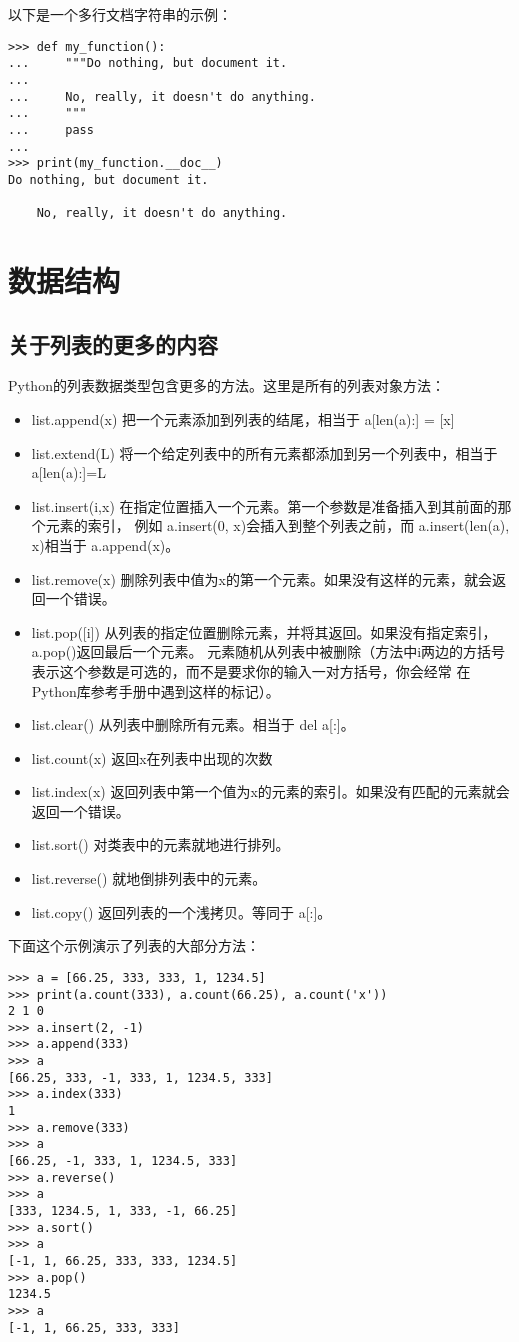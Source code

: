 \documentclass[UTF8]{ctexart}
\begin{document}
以下是一个多行文档字符串的示例：
\begin{verbatim}
>>> def my_function():
...     """Do nothing, but document it.
...
...     No, really, it doesn't do anything.
...     """
...     pass
...
>>> print(my_function.__doc__)
Do nothing, but document it.

	No, really, it doesn't do anything.
\end{verbatim}

\section{数据结构}
\subsection{关于列表的更多的内容}
Python的列表数据类型包含更多的方法。这里是所有的列表对象方法：
\begin{itemize}
  \item list.append(x) 把一个元素添加到列表的结尾，相当于 a[len(a):] = [x]
  \item list.extend(L) 将一个给定列表中的所有元素都添加到另一个列表中，相当于 a[len(a):]=L
  \item list.insert(i,x) 在指定位置插入一个元素。第一个参数是准备插入到其前面的那个元素的索引，
  例如 a.insert(0, x)会插入到整个列表之前，而 a.insert(len(a), x)相当于 a.append(x)。
  \item list.remove(x) 删除列表中值为x的第一个元素。如果没有这样的元素，就会返回一个错误。
  \item list.pop([i]) 从列表的指定位置删除元素，并将其返回。如果没有指定索引，a.pop()返回最后一个元素。
  元素随机从列表中被删除（方法中i两边的方括号表示这个参数是可选的，而不是要求你的输入一对方括号，你会经常
  在Python库参考手册中遇到这样的标记）。
  \item list.clear() 从列表中删除所有元素。相当于 del a[:]。
  \item list.count(x) 返回x在列表中出现的次数
  \item list.index(x) 返回列表中第一个值为x的元素的索引。如果没有匹配的元素就会返回一个错误。
  \item list.sort() 对类表中的元素就地进行排列。
  \item list.reverse() 就地倒排列表中的元素。
  \item list.copy() 返回列表的一个浅拷贝。等同于 a[:]。
\end{itemize}

下面这个示例演示了列表的大部分方法：
\begin{verbatim}
>>> a = [66.25, 333, 333, 1, 1234.5]
>>> print(a.count(333), a.count(66.25), a.count('x'))
2 1 0
>>> a.insert(2, -1)
>>> a.append(333)
>>> a
[66.25, 333, -1, 333, 1, 1234.5, 333]
>>> a.index(333)
1
>>> a.remove(333)
>>> a
[66.25, -1, 333, 1, 1234.5, 333]
>>> a.reverse()
>>> a
[333, 1234.5, 1, 333, -1, 66.25]
>>> a.sort()
>>> a
[-1, 1, 66.25, 333, 333, 1234.5]
>>> a.pop()
1234.5
>>> a
[-1, 1, 66.25, 333, 333]
\end{verbatim}
\end{document}
